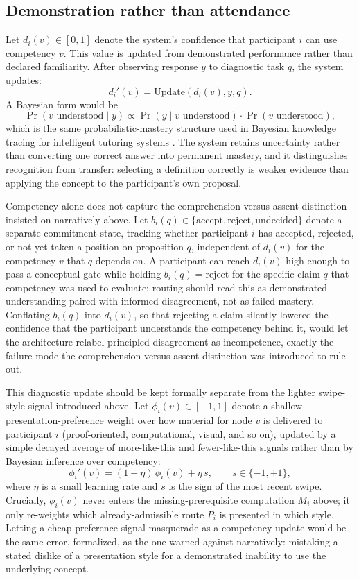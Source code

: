 \documentclass[11pt]{article}
\begin{document}
\subsection{Demonstration rather than attendance}

Let $d_i(v) \in [0,1]$ denote the system's confidence that participant $i$ can use competency $v$. This value is updated from demonstrated performance rather than declared familiarity. After observing response $y$ to diagnostic task $q$, the system updates:
\[
d_i'(v) = \mathrm{Update}(d_i(v), y, q).
\]
A Bayesian form would be
\[
\Pr(v \text{ understood} \mid y) \propto \Pr(y \mid v \text{ understood}) \cdot \Pr(v \text{ understood}),
\]
which is the same probabilistic-mastery structure used in Bayesian knowledge tracing for intelligent tutoring systems \cite{corbett1994}. The system retains uncertainty rather than converting one correct answer into permanent mastery, and it distinguishes recognition from transfer: selecting a definition correctly is weaker evidence than applying the concept to the participant's own proposal.

Competency alone does not capture the comprehension-versus-assent distinction insisted on narratively above. Let $b_i(q) \in \{\text{accept}, \text{reject}, \text{undecided}\}$ denote a separate commitment state, tracking whether participant $i$ has accepted, rejected, or not yet taken a position on proposition $q$, independent of $d_i(v)$ for the competency $v$ that $q$ depends on. A participant can reach $d_i(v)$ high enough to pass a conceptual gate while holding $b_i(q) = \text{reject}$ for the specific claim $q$ that competency was used to evaluate; routing should read this as demonstrated understanding paired with informed disagreement, not as failed mastery. Conflating $b_i(q)$ into $d_i(v)$, so that rejecting a claim silently lowered the confidence that the participant understands the competency behind it, would let the architecture relabel principled disagreement as incompetence, exactly the failure mode the comprehension-versus-assent distinction was introduced to rule out.

This diagnostic update should be kept formally separate from the lighter swipe-style signal introduced above. Let $\phi_i(v) \in [-1,1]$ denote a shallow presentation-preference weight over how material for node $v$ is delivered to participant $i$ (proof-oriented, computational, visual, and so on), updated by a simple decayed average of more-like-this and fewer-like-this signals rather than by Bayesian inference over competency:
\[
\phi_i'(v) = (1-\eta)\,\phi_i(v) + \eta\,s,
\qquad s \in \{-1, +1\},
\]
where $\eta$ is a small learning rate and $s$ is the sign of the most recent swipe. Crucially, $\phi_i(v)$ never enters the missing-prerequisite computation $M_i$ above; it only re-weights which already-admissible route $P_i$ is presented in which style. Letting a cheap preference signal masquerade as a competency update would be the same error, formalized, as the one warned against narratively: mistaking a stated dislike of a presentation style for a demonstrated inability to use the underlying concept.
\end{document}

